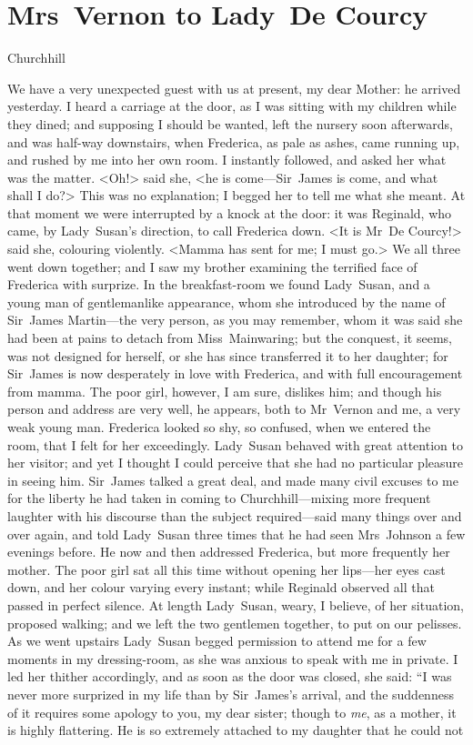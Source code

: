 \chapter{Mrs~Vernon to Lady~De Courcy}
  
  \begin{mail}{Churchhill}{}

We have a very unexpected guest with us at present, my dear Mother: he arrived yesterday. I heard a carriage at the door, as I was sitting with my children while they dined; and supposing I should be wanted, left the nursery soon afterwards, and was half-way downstairs, when Frederica, as pale as ashes, came running up, and rushed by me into her own room. I instantly followed, and asked her what was the matter. <Oh!> said she, <he is come—Sir~James is come, and what shall I do?> This was no explanation; I begged her to tell me what she meant. At that moment we were interrupted by a knock at the door: it was Reginald, who came, by Lady~Susan's direction, to call Frederica down. <It is Mr~De Courcy!> said she, colouring violently. <Mamma has sent for me; I must go.> We all three went down together; and I saw my brother examining the terrified face of Frederica with surprize. In the breakfast-room we found Lady~Susan, and a young man of gentlemanlike appearance, whom she introduced by the name of Sir~James Martin—the very person, as you may remember, whom it was said she had been at pains to detach from Miss~Mainwaring; but the conquest, it seems, was not designed for herself, or she has since transferred it to her daughter; for Sir~James is now desperately in love with Frederica, and with full encouragement from mamma. The poor girl, however, I am sure, dislikes him; and though his person and address are very well, he appears, both to Mr~Vernon and me, a very weak young man. Frederica looked so shy, so confused, when we entered the room, that I felt for her exceedingly. Lady~Susan behaved with great attention to her visitor; and yet I thought I could perceive that she had no particular pleasure in seeing him. Sir~James talked a great deal, and made many civil excuses to me for the liberty he had taken in coming to Churchhill—mixing more frequent laughter with his discourse than the subject required—said many things over and over again, and told Lady~Susan three times that he had seen Mrs~Johnson a few evenings before. He now and then addressed Frederica, but more frequently her mother. The poor girl sat all this time without opening her lips—her eyes cast down, and her colour varying every instant; while Reginald observed all that passed in perfect silence. At length Lady~Susan, weary, I believe, of her situation, proposed walking; and we left the two gentlemen together, to put on our pelisses. As we went upstairs Lady~Susan begged permission to attend me for a few moments in my dressing-room, as she was anxious to speak with me in private. I led her thither accordingly, and as soon as the door was closed, she said: “I was never more surprized in my life than by Sir~James's arrival, and the suddenness of it requires some apology to you, my dear sister; though to \textit{me}, as a mother, it is highly flattering. He is so extremely attached to my daughter that he could not 
\end{mail}
